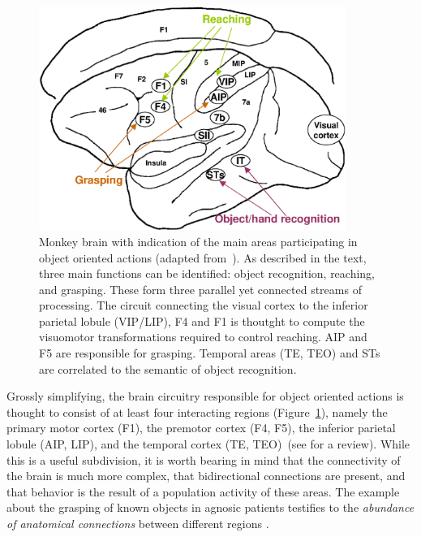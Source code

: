 %
%
\begin{figure}[tb]
\begin{center}
\includegraphics[width=10cm]{brain-schema.eps}
\caption{ 
\label{fig:brain-schema}
%
Monkey brain with indication of the main areas participating in object
oriented actions (adapted from~\cite{fagg-arbib-1998}). As described in the
text, three main functions can be identified: object recognition, reaching,
and grasping. These form three parallel yet connected streams of 
processing. The circuit connecting the visual cortex to the inferior parietal 
lobule (VIP/LIP), F4 and F1 is thoutght to compute the visuomotor
transformations required to control reaching. AIP and F5 are responsible for
grasping. Temporal areas (TE, TEO) and STs are correlated to the
semantic of object recognition.
%
}
\end{center}
\end{figure}
%
%

Grossly simplifying, the brain circuitry responsible 
for object oriented actions is thought to consist of at least four 
interacting regions (Figure~\ref{fig:brain-schema}), namely the primary motor cortex (F1), the premotor cortex (F4, F5), the 
inferior parietal lobule (AIP, LIP), and the temporal cortex 
(TE, TEO)~(see \cite{rizzolatti-fogassi-gallese-1997,fadiga00visuomotor,jeannerod97cognitive} 
for a review). 
While this is a useful subdivision, it is worth bearing in mind 
that the connectivity of the brain is much more complex, that bidirectional 
connections are present, and that behavior is the result of a 
population activity of these areas. The example about the grasping of known 
objects in agnosic patients testifies to the \emph{abundance of anatomical connections} 
between different regions \cite{jeannerod-arbib-rizzolatti-sakata-1995}.

